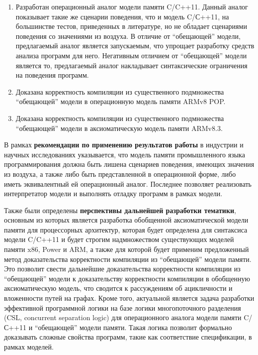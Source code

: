 \begin{enumerate}
  \item Разработан операционный аналог модели памяти C/C++11.
    Данный аналог показывает такие же сценарии поведения, что и модель C/С++11, на большинстве
    тестов, приведенных в литературе, но не обладает сценариями поведения со значениями из воздуха.
    В отличие от ``обещающей'' модели, предлагаемый аналог является запускаемым, что упрощает
    разработку средств анализа программ для него. Негативным отличием от ``обещающей'' модели является то,
    предлагаемый аналог накладывает синтаксические ограничения на поведения программ.
  \item Доказана корректность компиляции из существенного подмножества ``обещающей'' модели в операционную модель
    памяти ARMv8 POP.
  \item Доказана корректность компиляции из существенного подмножества ``обещающей'' модели в
    аксиоматическую модель памяти ARMv8.3.
\end{enumerate}

В рамках \textbf{рекомендации по применению результатов работы} в индустрии и научных исследованиях указывается,
что модель памяти промышленного языка программирования должна быть лишена сценариев поведения, имеющих значения
из воздуха, а также либо быть представленной в операционной форме, либо иметь эквивалентный ей операционный аналог.
Последнее позволяет реализовать интерпретатор модели и выполнять отладку программ в рамках модели.

Также были определены \textbf{перспективы дальнейшей разработки тематики}, основным из которых является
разработка обобщенной аксиоматической модели памяти для процессорных архитектур, которая будет
определена для синтаксиса модели C/C++11 и будет строгим надмножеством существующих моделей памяти
x86, Power и ARM, а также для которой будет применим предложенный метод доказательства корректности компиляции
из ``обещающей'' модели памяти. Это позволит свести дальнейшие доказательства корректности компиляции из
``обещающей'' модели к доказательству корректности компиляции в обобщенную аксиоматическую модель, что
сводится к рассуждениям об ацикличности и вложенности путей на графах.
Кроме того, актуальной является задача разработки эффективной программной логики на базе логики многопоточного разделения
(CSL, concurrent separation logic) для операционного аналога модели памяти C/С++11 и ``обещающей'' модели памяти.
Такая логика позволит формально доказывать сложные свойства программ, такие как соответствие спецификации, в рамках моделей.


